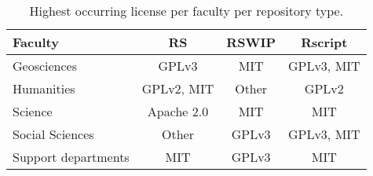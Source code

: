 
\begin{table}[h!]
\centering
\begin{tabular}{lccc}
\toprule
Faculty &          RS &  RSWIP &     Rscript \\
\midrule
Geosciences         &       GPLv3 &    MIT &  GPLv3, MIT \\
Humanities          &  GPLv2, MIT &  Other &       GPLv2 \\
Science             &  Apache 2.0 &    MIT &         MIT \\
Social Sciences     &       Other &  GPLv3 &  GPLv3, MIT \\
Support departments &         MIT &  GPLv3 &         MIT \\
\bottomrule
\end{tabular}
\caption{Highest occurring license per faculty per repository type.}
\label{tab:highest_license}
\end{table}
